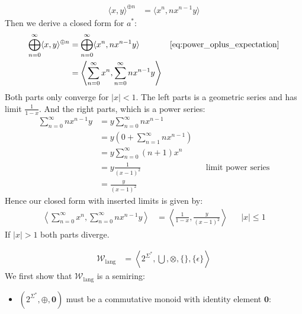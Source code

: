 \documentclass[a4paper,12pt]{ETHexercise}
\begin{document}
\begin{question}
\begin{subquestion}
\begin{align}
			\langle x, y \rangle^{\oplus n} & = \langle x^n, nx^{n-1}y \rangle \label{eq:power_oplus_expectation}
		\end{align}
		Then we derive a closed form for $a^*$:
		\begin{align}
			\bigoplus_{n=0}^{\infty} \langle x, y \rangle^{\oplus n} & = \bigoplus_{n=0}^{\infty} \langle x^n, nx^{n-1}y \rangle                             & \text{\cref*{eq:power_oplus_expectation}} \\
			                                                         & = \left\langle \sum_{n=0}^{\infty} x^{n}, \sum_{n=0}^{\infty} nx^{n-1} y\right\rangle
		\end{align}
		Both parts only converge for $|x| < 1$. The left parts is a geometric series and has limit $\frac{1}{1-x}$. And the right parts, which is a power series:
		\begin{align}
			\sum_{n=0}^{\infty} nx^{n-1} y & = y \sum_{n=0}^{\infty} nx^{n-1}                                                  \\
			                               & = y \left( 0 + \sum_{n=1}^{\infty} nx^{n-1}\right)                                \\
			                               & = y \sum_{n=0}^{\infty} (n+1) x^{n}                                               \\
			                               & = y \frac{1}{(x -1)^2}                             &  & \text{limit power series} \\
			                               & = \frac{y}{(x-1)^2}
		\end{align}
		Hence our closed form with inserted limits is given by:
		\begin{align}
			\left\langle \sum_{n=0}^{\infty} x^{n}, \sum_{n=0}^{\infty} nx^{n-1} y\right\rangle & = \left\langle \frac{1}{1-x}, \frac{y}{(x-1)^2}\right\rangle &  & |x| \leq 1
		\end{align}
		If $|x| > 1$ both parts diverge.
	\end{subquestion}
	\begin{subquestion}
		\begin{align}
			\mathcal{W}_{\text{lang}} & =\left\langle 2^{\Sigma^*}, \bigcup, \otimes, \{\}, \{\epsilon\} \right\rangle
		\end{align}
		We first show that $\mathcal{W}_{\text{lang}}$ is a semiring:
		\begin{itemize}
			\item  $(2^{\Sigma^*}, \oplus, \mathbf{0})$ must be a commutative monoid with identity element $\mathbf{0}$:

\end{itemize}
\end{subquestion}
\end{question}
\end{document}
